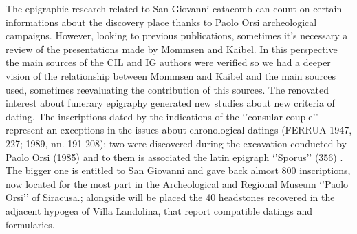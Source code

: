 \documentclass[amsthm,ebook]{saparticle}
\begin{document}
The epigraphic research related to San Giovanni catacomb can count on certain informations about the discovery place thanks to Paolo Orsi archeological campaigns. However, looking to previous publications, sometimes it’s necessary a review of the presentations made by Mommsen and Kaibel. In this perspective the main sources of the CIL and IG authors were verified so we had a deeper vision of the relationship between Mommsen and Kaibel and the main sources used, sometimes reevaluating the contribution of this sources. The renovated interest about funerary epigraphy generated new studies about new criteria of dating. The inscriptions dated by the indications of the ‘’consular couple’’ represent an exceptions in the issues about chronological datings (FERRUA 1947, 227; 1989, nn. 191-208): two were discovered during the excavation conducted by Paolo Orsi (1985) and to them is associated the latin epigraph ‘’Sporus’’ (356) .
The bigger one is entitled to San Giovanni and gave back almost 800 inscriptions, now located for the most part in the Archeological and Regional Museum ‘’Paolo Orsi’’ of Siracusa.; alongside will be placed the 40 headstones recovered in the adjacent hypogea of Villa Landolina, that report compatible datings and formularies.
 
\end{document}
